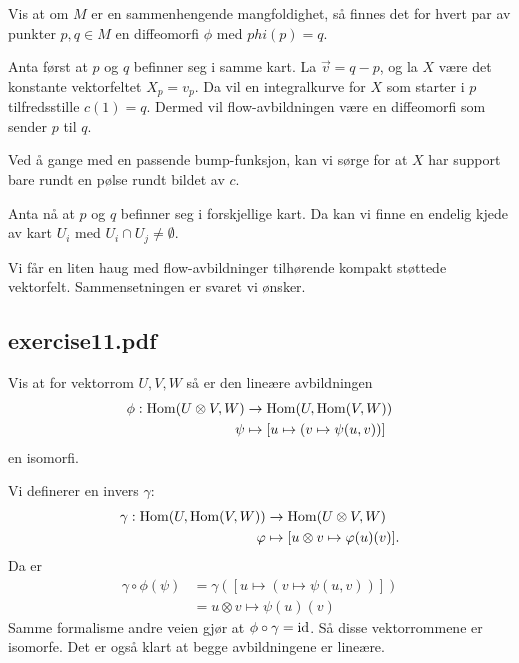 \documentclass[11pt, english]{article}
\begin{document}
\begin{exc}
Vis at om $M$ er en sammenhengende mangfoldighet, så finnes det for hvert par av punkter $p,q \in M$ en diffeomorfi $\phi$ med $phi(p)=q$. 
\end{exc}
\begin{sol}
Anta først at $p$ og $q$ befinner seg i samme kart. La $\vec v = q -p$, og la $X$ være det konstante vektorfeltet $X_p=v_p$. Da vil en integralkurve for $X$ som starter i $p$ tilfredsstille $c(1)=q$. Dermed vil flow-avbildningen være en diffeomorfi som sender $p$ til $q$.

Ved å gange med en passende bump-funksjon, kan vi sørge for at $X$ har support bare rundt en pølse rundt bildet av $c$.

Anta nå at $p$ og $q$ befinner seg i forskjellige kart. Da kan vi finne en endelig kjede av kart $U_i$ med $U_i \cap U_j \neq \emptyset$.

Vi får en liten haug med flow-avbildninger tilhørende kompakt støttede vektorfelt. Sammensetningen er svaret vi ønsker.
\end{sol}

\subsection{exercise11.pdf}

\begin{oppg}
Vis at for vektorrom $U,V,W$ så er den lineære avbildningen
\begin{align*}
\phi:\operatorname{Hom}(U \otimes V, W) &\to \operatorname{Hom}(U, \operatorname{Hom}(V,W)) \\
\psi &\mapsto [u \mapsto (v \mapsto \psi(u,v))]
\end{align*}
en isomorfi.
\end{oppg}
\begin{losn}
Vi definerer en invers $\gamma$:
\begin{align*}
\gamma:\operatorname{Hom}(U, \operatorname{Hom}(V,W)) &\to  \operatorname{Hom}(U \otimes V, W) \\
\varphi &\mapsto [u \otimes v \mapsto \varphi(u)(v)].
\end{align*}
Da er
\begin{align*}
\gamma \circ \phi(\psi) &= \gamma( [u \mapsto (v \mapsto \psi(u,v))]) \\
&= u \otimes v \mapsto \psi(u)(v)
\end{align*}
Samme formalisme andre veien gjør at $\phi \circ \gamma = \text{id}$. Så disse vektorrommene er isomorfe. Det er også klart at begge avbildningene er lineære.
\end{losn}
\end{document}

